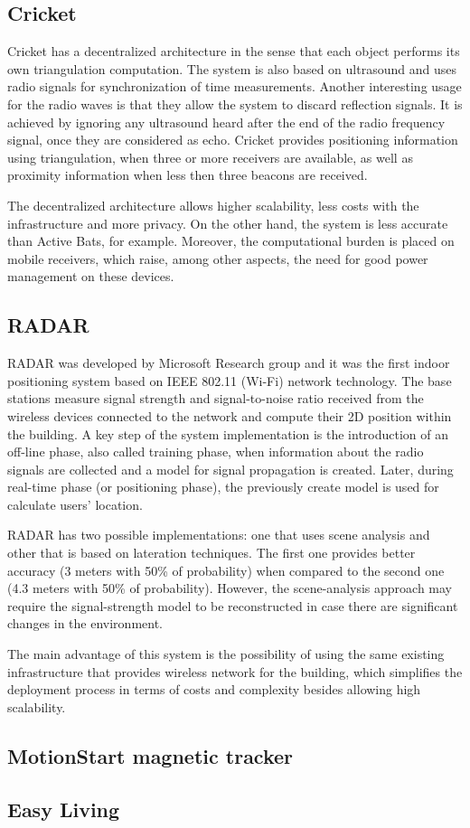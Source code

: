 \subsection{Cricket}
Cricket has a decentralized architecture in the sense that each object performs its own triangulation computation. The system is also based on ultrasound and uses radio signals for synchronization of time measurements. Another interesting usage for the radio waves is that they allow the system to discard reflection signals. It is achieved by ignoring any ultrasound heard after the end of the radio frequency signal, once they are considered as echo. Cricket provides positioning information using triangulation, when three or more receivers are available, as well as proximity information when less then three beacons are received.

The decentralized architecture allows higher scalability, less costs with the infrastructure and more privacy. On the other hand, the system is less accurate than Active Bats, for example. Moreover, the computational burden is placed on mobile receivers, which raise, among other aspects, the need for good power management on these devices.

\subsection{RADAR}
RADAR was developed by Microsoft Research group and it was the first indoor positioning system based on IEEE 802.11 (Wi-Fi) network technology. The base stations measure signal strength and signal-to-noise ratio received from the wireless devices connected to the network and compute their 2D position within the building. A key step of the system implementation is the introduction of an off-line phase, also called training phase, when information about the radio signals are collected and a model for signal propagation is created. Later, during real-time phase (or positioning phase), the previously create model is used for calculate users' location.

RADAR has two possible implementations: one that uses scene analysis and other that is based on lateration techniques. The first one provides better accuracy (3 meters with 50\% of probability) when compared to the second one (4.3 meters with 50\% of probability). However, the scene-analysis approach may require the signal-strength model to be reconstructed in case there are significant changes in the environment.

The main advantage of this system is the possibility of using the same existing infrastructure that provides wireless network for the building, which simplifies the deployment process in terms of costs and complexity besides allowing high scalability.

\subsection{MotionStart magnetic tracker}


\subsection{Easy Living}

